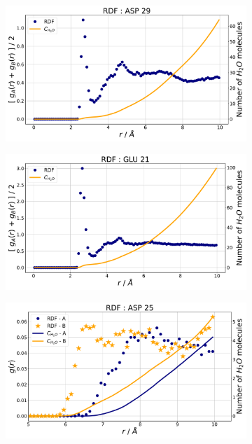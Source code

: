 \documentclass[12pt,a4paper]{article}
\begin{document}
	\begin{figure}[h]
		\begin{subfigure}[l]{0.48\textwidth}
			\centering
			\includegraphics[width=\textwidth]{images/plots-rdf-ASP29.pdf}
			\caption{}
			\label{fig:an:rdf-asp29}
		\end{subfigure}
		\begin{subfigure}[r]{0.48\textwidth}
			\centering
			\includegraphics[width=\textwidth]{images/plots-rdf-GLU21.pdf}
			\caption{}
			\label{fig:an:rdf-glu21}
		\end{subfigure}
		\centering
		\begin{subfigure}[b]{0.6\textwidth}
			\centering
			\includegraphics[width=\textwidth]{images/plots-rdf-ASP25.pdf}

\end{subfigure}
\end{figure}
\end{document}

